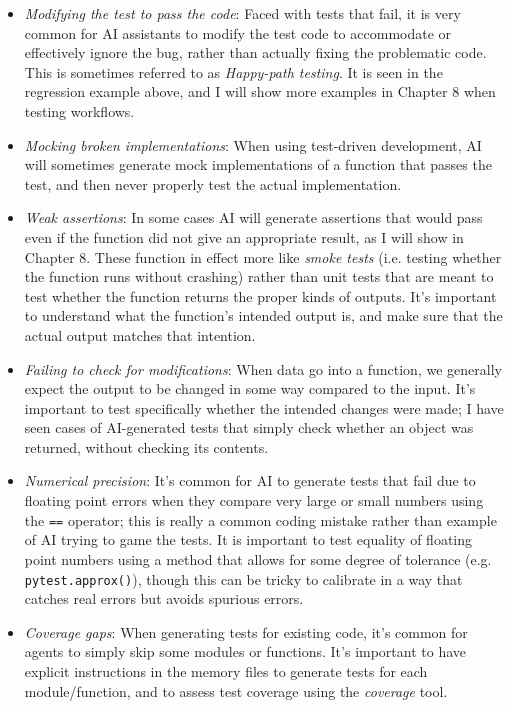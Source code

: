 \begin{itemize}
\item \textit{Modifying the test to pass the code}: Faced with tests that fail, it is very common for AI assistants to modify the test code to accommodate or effectively ignore the bug, rather than actually fixing the problematic code. This is sometimes referred to as \textit{Happy-path testing}. It is seen in the regression example above, and I will show more examples in Chapter 8 when testing workflows.
\item \textit{Mocking broken implementations}: When using test-driven development, AI will sometimes generate mock implementations of a function that passes the test, and then never properly test the actual implementation.
\item \textit{Weak assertions}: In some cases AI will generate assertions that would pass even if the function did not give an appropriate result, as I will show in Chapter 8. These function in effect more like \textit{smoke tests} (i.e. testing whether the function runs without crashing) rather than unit tests that are meant to test whether the function returns the proper kinds of outputs.  It's important to understand what the function's intended output is, and make sure that the actual output matches that intention.
\item \textit{Failing to check for modifications}: When data go into a function, we generally expect the output to be changed in some way compared to the input.  It's important to test specifically whether the intended changes were made; I have seen cases of AI-generated tests that simply check whether an object was returned, without checking its contents.
\item \textit{Numerical precision}: It's common for AI to generate tests that fail due to floating point errors when they compare very large or small numbers using the \texttt{==} operator; this is really a common coding mistake rather than example of AI trying to game the tests.  It is important to test equality of floating point numbers using a method that allows for some degree of tolerance (e.g. \texttt{pytest.approx()}), though this can be tricky to calibrate in a way that catches real errors but avoids spurious errors.
\item \textit{Coverage gaps}: When generating tests for existing code, it's common for agents to simply skip some modules or functions.  It's important to have explicit instructions in the memory files to generate tests for each module/function, and to assess test coverage using the \textit{coverage} tool.

\end{itemize}
